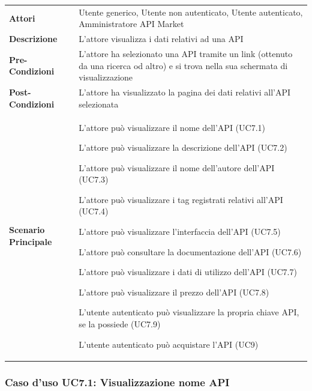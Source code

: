 \begin{longtable}{ l | p{11cm}}
	\hline
	\rowcolor{Gray}
	\multicolumn{2}{c}{UC7 - Visualizzazione API}\\
	\hline
	
	 \textbf{Attori} & Utente generico, Utente non autenticato, Utente autenticato, Amministratore API Market \\
	\textbf{Descrizione} & L'attore visualizza i dati relativi ad una API \\
	\textbf{Pre-Condizioni} & L'attore ha selezionato una API tramite un link (ottenuto da una ricerca od altro) e si trova nella sua schermata di visualizzazione \\
	\textbf{Post-Condizioni} & L'attore ha visualizzato la pagina dei dati relativi all'API selezionata \\
	\textbf{Scenario Principale} &
	\begin{enumerate*}[label=(\arabic*.),itemjoin={\newline}]
		\item L'attore può visualizzare il nome dell'API (UC7.1)
		\item L'attore può visualizzare la descrizione dell'API (UC7.2)
		\item L'attore può visualizzare il nome dell'autore dell'API (UC7.3)
		\item L'attore può visualizzare i tag registrati relativi all'API (UC7.4)
		\item L'attore può visualizzare l'interfaccia dell'API (UC7.5)
		\item L'attore può consultare la documentazione dell'API (UC7.6)
		\item L'attore può visualizzare i dati di utilizzo dell'API (UC7.7)
		\item L'attore può visualizzare il prezzo dell'API (UC7.8)
		\item L'utente autenticato può visualizzare la propria chiave API, se la possiede (UC7.9)
		\item L'utente autenticato può acquistare l'API (UC9)
	\end{enumerate*}\\
\end{longtable}


\subsubsection{Caso d'uso UC7.1: Visualizzazione nome API}
\label{UC7_1}

